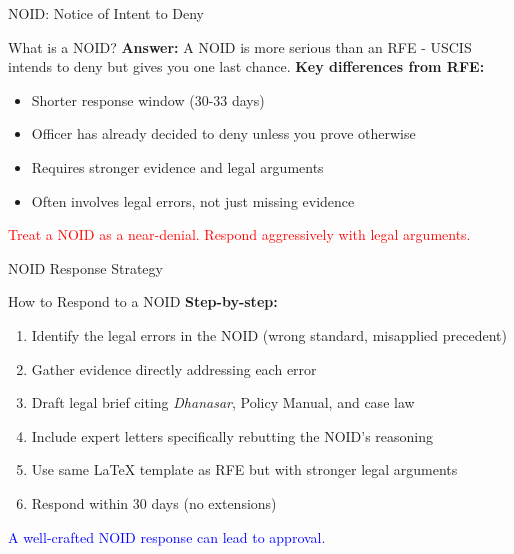 \documentclass[11pt]{beamer}
\begin{document}
	
	\begin{frame}{NOID: Notice of Intent to Deny}
		\scriptsize
		\begin{block}{What is a NOID?}
			\textbf{Answer:} A NOID is more serious than an RFE - USCIS intends to deny but gives you one last chance.
			\vspace{0.2cm}
			\textbf{Key differences from RFE:}
			\begin{itemize}
				\item Shorter response window (30-33 days)
				\item Officer has already decided to deny unless you prove otherwise
				\item Requires stronger evidence and legal arguments
				\item Often involves legal errors, not just missing evidence
			\end{itemize}
			\textcolor{red}{Treat a NOID as a near-denial. Respond aggressively with legal arguments.}
		\end{block}
	\end{frame}
	
	\begin{frame}{NOID Response Strategy}
		\scriptsize
		\begin{block}{How to Respond to a NOID}
			\textbf{Step-by-step:}
			\begin{enumerate}
				\item Identify the legal errors in the NOID (wrong standard, misapplied precedent)
				\item Gather evidence directly addressing each error
				\item Draft legal brief citing \textit{Dhanasar}, Policy Manual, and case law
				\item Include expert letters specifically rebutting the NOID's reasoning
				\item Use same LaTeX template as RFE but with stronger legal arguments
				\item Respond within 30 days (no extensions)
			\end{enumerate}
			\textcolor{blue}{A well-crafted NOID response can lead to approval.}
		\end{block}
	\end{frame}
	
	
\end{document}
